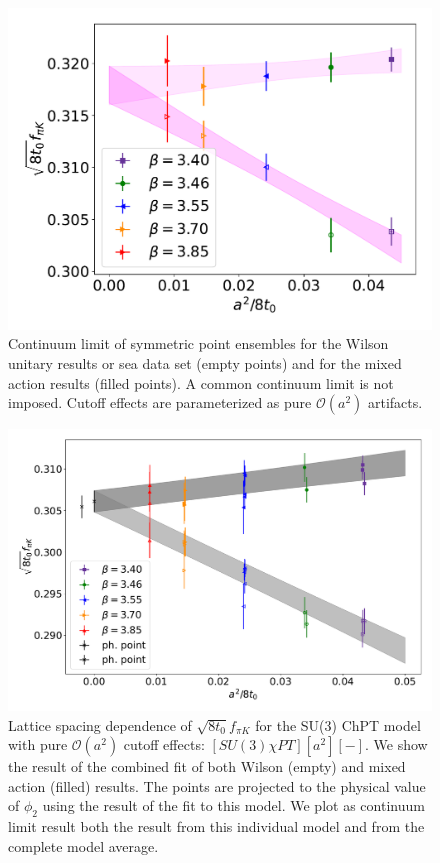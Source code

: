 \begin{figure}
    \centering
    \includegraphics[width=1.\textwidth]{./cap5/figs/continuum_sym.pdf}
    \caption{Continuum limit of symmetric point ensembles for the Wilson unitary results or sea data set (empty points) and for the mixed action results (filled points). A common continuum limit is not imposed. Cutoff effects are parameterized as pure $\mathcal{O}(a^2)$ artifacts.}
    \label{ch_ss:fig:universality}
\end{figure}

\begin{figure}
    \centering
    \includegraphics[width=1.\textwidth]{./cap5/figs/SU3a2_projection.pdf}
    \caption{Lattice spacing dependence of $\sqrt{8t_0}f_{\pi K}$ for the SU(3) ChPT model with pure $\mathcal{O}(a^2)$ cutoff effects: $[SU(3)\chi PT][a^2][-]$. We show the result of the combined fit of both Wilson (empty) and mixed action (filled) results. The points are projected to the physical value of $\phi_2$ using the result of the fit to this model. We plot as continuum limit result both the result from this individual model and from the complete model average.}
    \label{ch_ss:fig:projection}
\end{figure}


